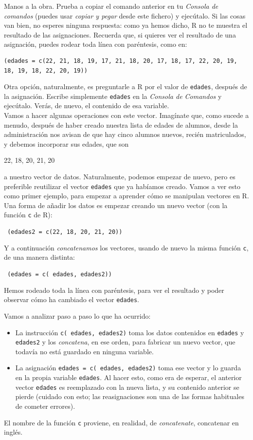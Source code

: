 \documentclass[10pt,a4paper]{article}\usepackage[]{graphicx}\usepackage[]{color}
\newcounter {cont01}
\begin{document}
Manos a la obra. Prueba a copiar el comando anterior en tu {\em Consola de comandos} (puedes usar {\em copiar y pegar} desde este fichero) y ejecútalo. Si las cosas van bien, no esperes ninguna respuesta: como ya hemos dicho, R no te muestra el resultado de las asignaciones. Recuerda que, si quieres ver el resultado de una asignación, puedes rodear toda línea con paréntesis, como en:
{\small
\begin{verbatim}
(edades = c(22, 21, 18, 19, 17, 21, 18, 20, 17, 18, 17, 22, 20, 19, 18, 19, 18, 22, 20, 19))
\end{verbatim}
}
Otra opción, naturalmente, es preguntarle a R por el valor de {\tt edades}, después de la asignación. Escribe simplemente {\tt edades} en la {\em Consola de Comandos} y ejecútalo. Verás, de nuevo, el contenido de esa variable.\\

Vamos a hacer algunas operaciones con este vector. Imagínate que, como sucede a menudo, después de haber creado nuestra lista de edades de alumnos, desde la administración nos avisan de que hay cinco alumnos nuevos, recién matriculados, y debemos incorporar sus edades, que son
\begin{center}
22, 18, 20, 21, 20
\end{center}
a nuestro vector de datos. Naturalmente, podemos empezar de nuevo, pero es preferible reutilizar el vector {\tt edades} que ya habíamos creado. Vamos a ver esto como primer ejemplo, para empezar a aprender cómo se manipulan vectores en R. Una forma de añadir los datos es empezar creando un nuevo vector (con la función {\tt c} de R):
\begin{center}
{\tt
(edades2 = c(22, 18, 20, 21, 20))
}
\end{center}
Y a continuación {\em concatenamos} los vectores, usando de nuevo la misma función {\tt c}, de una manera distinta:
\begin{center}
{\tt
(edades = c( edades, edades2))
}
\end{center}
Hemos rodeado toda la línea con paréntesis, para ver el resultado y poder observar cómo ha cambiado el vector {\tt edades}.


Vamos a analizar paso a paso lo que ha ocurrido:
\begin{itemize}
  \item La instrucción {\tt c( edades, edades2)} toma los datos contenidos en {\tt edades} y {\tt edades2} y los {\em concatena}, en ese orden, para fabricar un nuevo vector, que todavía no está guardado en ninguna variable.

  \item La asignación {\tt edades = c( edades, edades2)} toma ese vector y lo guarda en la propia variable {\tt edades}. Al hacer esto, como era de esperar, el anterior vector {\tt edades} es reemplazado con la nueva lista, y su contenido anterior se pierde (cuidado con esto; las reasignaciones son una de las formas habituales de cometer errores).
\end{itemize}
El nombre de la función {\tt c} proviene, en realidad, de {\em concatenate}, concatenar en inglés.
\end{document}
